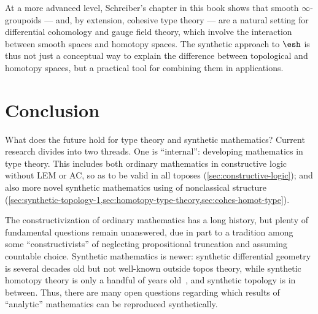 \documentclass[10pt]{article}
\def\oo{\ensuremath{\infty}}
\numberwithin{equation}{section}
\newcommand{\shape}{\ensuremath{\mathord{\raisebox{0.5pt}{\text{\rm\esh}}}}}
\begin{document}
At a more advanced level, Schreiber's chapter in this book shows that smooth \oo-groupoids --- and, by extension, cohesive type theory --- are a natural setting for differential cohomology and gauge field theory, which involve the interaction between smooth spaces and homotopy spaces.
The synthetic approach to $\shape$ is thus not just a conceptual way to explain the difference between topological and homotopy spaces, but a practical tool for combining them in applications.


\section{Conclusion}
\label{sec:conclusion}

What does the future hold for type theory and synthetic mathematics?
Current research divides into two threads.
One is ``internal'': developing mathematics in type theory.
This includes both ordinary mathematics in constructive logic without LEM or AC, so as to be valid in all toposes (\cref{sec:constructive-logic}); and also more novel synthetic mathematics using of nonclassical structure (\cref{sec:synthetic-topology-1,sec:homotopy-type-theory,sec:cohes-homot-type}).

The constructivization of ordinary mathematics has a long history, but plenty of fundamental questions remain unanswered, due in part to a tradition among some ``constructivists'' of neglecting propositional truncation and assuming countable choice.
Synthetic mathematics is newer: synthetic differential geometry is several decades old but not well-known outside topos theory, while synthetic homotopy theory is only a handful of years old~\cite{ls:pi1s1,hottbook}, and synthetic topology is in between.
Thus, there are many open questions regarding which results of ``analytic'' mathematics can be reproduced synthetically.

\end{document}
